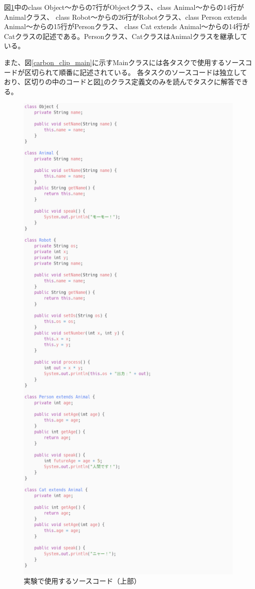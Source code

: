 \documentclass[paper=a4paper,fontsize=11pt]{jlreq}
\begin{document}
      図\ref{carbon_clip_class}中のclass Object～からの7行がObjectクラス、class Animal～からの14行がAnimalクラス、
      class Robot～からの26行がRobotクラス、class Person extends Animal～からの15行がPersonクラス、
      class Cat extends Animal～からの14行がCatクラスの記述である。Personクラス、CatクラスはAnimalクラスを継承している。

      また、図\ref{carbon_clip_main}に示すMainクラスには各タスクで使用するソースコードが区切られて順番に記述されている。
      各タスクのソースコードは独立しており、区切りの中のコードと図\ref{carbon_clip_class}のクラス定義文のみを読んでタスクに解答できる。
      \begin{figure}[h]
        \centering
        \includegraphics[height=\textheight]{carbon_clip_class.png}
        \caption{実験で使用するソースコード（上部）}
        \label{carbon_clip_class}
      \end{figure}
\end{document}

